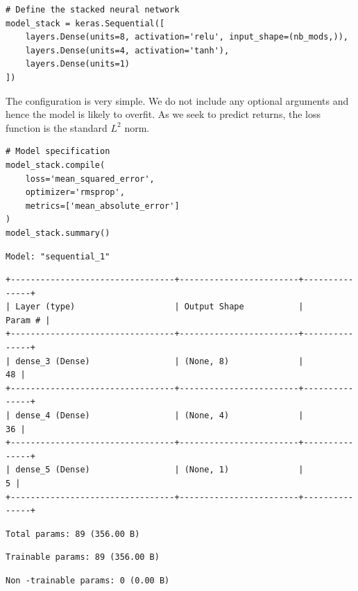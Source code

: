 \begin{verbatim}
# Define the stacked neural network
model_stack = keras.Sequential([
    layers.Dense(units=8, activation='relu', input_shape=(nb_mods,)),
    layers.Dense(units=4, activation='tanh'),
    layers.Dense(units=1)
])
\end{verbatim}

The configuration is very simple. We do not include any optional arguments and hence the model is likely to overfit. As we seek to predict returns, the loss function is the standard $L^2$ norm.

\begin{verbatim}
# Model specification
model_stack.compile(
    loss='mean_squared_error',
    optimizer='rmsprop',
    metrics=['mean_absolute_error']
)
model_stack.summary()
\end{verbatim}

\begin{verbatim}
Model: "sequential_1"
\end{verbatim}

\begin{verbatim}
+---------------------------------+------------------------+---------------+
| Layer (type)                    | Output Shape           |       Param # |
+---------------------------------+------------------------+---------------+
| dense_3 (Dense)                 | (None, 8)              |            48 |
+---------------------------------+------------------------+---------------+
| dense_4 (Dense)                 | (None, 4)              |            36 |
+---------------------------------+------------------------+---------------+
| dense_5 (Dense)                 | (None, 1)              |             5 |
+---------------------------------+------------------------+---------------+
\end{verbatim}

\begin{verbatim}
Total params: 89 (356.00 B)
\end{verbatim}

\begin{verbatim}
Trainable params: 89 (356.00 B)
\end{verbatim}

\begin{verbatim}
Non -trainable params: 0 (0.00 B)
\end{verbatim}

